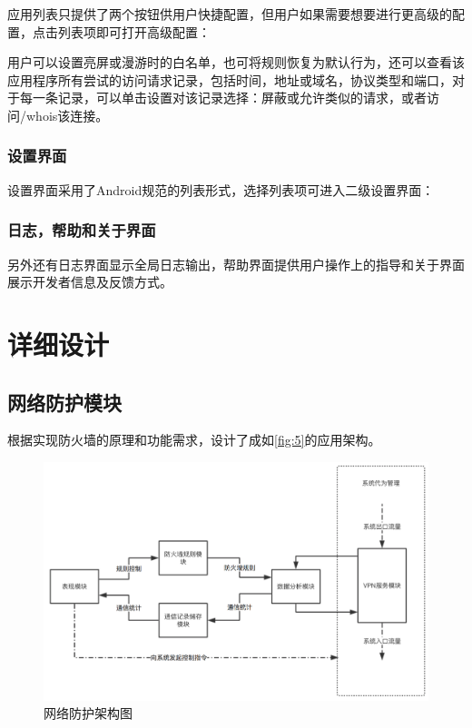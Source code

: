 \documentclass[format=final, language=chinese, degree=fyp]{hustthesis}
\begin{document}
应用列表只提供了两个按钮供用户快捷配置，但用户如果需要想要进行更高级的配置，点击列表项即可打开高级配置：


用户可以设置亮屏或漫游时的白名单，也可将规则恢复为默认行为，还可以查看该应用程序所有尝试的访问请求记录，包括时间，地址或域名，协议类型和端口，对于每一条记录，可以单击设置对该记录选择：屏蔽或允许类似的请求，或者访问/whois该连接。

\subsection{设置界面}

设置界面采用了Android规范的列表形式，选择列表项可进入二级设置界面：

\subsection{日志，帮助和关于界面}

另外还有日志界面显示全局日志输出，帮助界面提供用户操作上的指导和关于界面展示开发者信息及反馈方式。

\chapter{详细设计}

\section{网络防护模块}

根据实现防火墙的原理和功能需求，设计了成如\autoref{fig:5}的应用架构。

\begin{figure}[!h]
\centering
\includegraphics[width=1\textwidth]{function_1_ori.png}
\caption{网络防护架构图}\label{fig:5}
\end{figure}
\end{document}
